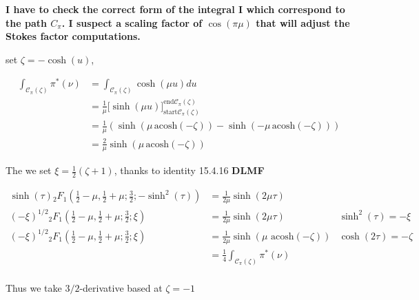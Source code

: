 \documentclass{article}
\begin{document}
\textbf{I have to check the correct form of the integral I which correspond to the path $C_\pi$. I suspect a scaling factor of $\cos(\pi \mu)$ that will adjust the Stokes factor computations.}

set $\zeta=-\cosh(u)$, 

\begin{align*}
\int_{\mathcal{C}_\pi(\zeta)}\pi^*(\nu)&=\int_{\mathcal{C}_\pi(\zeta)}\cosh(\mu u)du\\
&=\frac{1}{\mu}\Big[\sinh(\mu u)\Big]_{\mathrm{start}\mathcal{C}_\pi(\zeta)}^{\mathrm{end}\mathcal{C}_\pi(\zeta)}\\
&=\frac{1}{\mu}\left(\sinh\left(\mu\,\mathrm{acosh}\left(-\zeta\right)\right)-\sinh\left(-\mu\,\mathrm{acosh}\left(-\zeta\right)\right)\right)\\
&=\frac{2}{\mu}\sinh\left(\mu\,\mathrm{acosh}\left(-\zeta\right)\right)
\end{align*}


The we set $\xi=\frac{1}{2}\left(\zeta+1\right)$, thanks to identity 15.4.16 \textbf{DLMF}

\begin{align*}
\sinh(\tau) {}_2F_1\left(\frac{1}{2}-\mu,\frac{1}{2}+\mu;\frac{3}{2};-\sinh^2(\tau)\right)&=\frac{1}{2\mu}\sinh(2\mu\tau) & \\
(-\xi)^{1/2} {}_2F_1\left(\frac{1}{2}-\mu,\frac{1}{2}+\mu;\frac{3}{2};\xi\right)&=\frac{1}{2\mu}\sinh(2\mu\tau)  & \sinh^2(\tau)=-\xi \\
(-\xi)^{1/2} {}_2F_1\left(\frac{1}{2}-\mu,\frac{1}{2}+\mu;\frac{3}{2};\xi\right)&=\frac{1}{2\mu}\sinh(\mu\,\,\mathrm{acosh}\left(-\zeta\right))  & \cosh(2\tau)=-\zeta \\
&=\frac{1}{4}\int_{\mathcal{C}_\pi(\zeta)}\pi^*(\nu) &\\
\end{align*}

Thus we take $3/2$-derivative based at $\zeta=-1$
\end{document}
